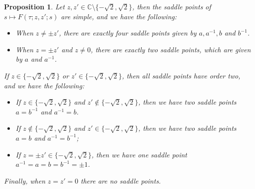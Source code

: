 \documentclass[%
 jmp,
cp,  %
 amsmath,amsthm,amssymb,%
 reprint,%
onecolumn]{revtex4-2}
\newtheorem{proposition}[theorem]{Proposition}
\begin{document}
\begin{proposition} \label{prop:saddlePointsDef}
Let $z,z'\in \mathbb C\setminus \{-\sqrt 2, \sqrt 2\}$, then the saddle points of $s\mapsto F(\tau;z,z';s)$ are simple, and we have the following:
\begin{itemize}
\item[(i)] When $z \neq  \pm z'$, there are exactly four saddle points  given by $a, a^{-1}, b$ and $b^{-1}$.
\item[(ii)] When $z=\pm z'$ and $z\neq 0$, there are exactly two  saddle points, which are given by $a$ and $a^{-1}$.
\end{itemize}
If $z\in \{-\sqrt{2},\sqrt{2}\}$ or $z'\in \{-\sqrt{2},\sqrt{2}\}$, then all saddle points have order two, and we have the following:
\begin{itemize}
    \item[(iii)] If $z\in \{-\sqrt 2, \sqrt 2\}$ and $z'\not\in \{-\sqrt 2, \sqrt 2\}$, then we have two saddle points $a=b^{-1}$ and $a^{-1}=b$.
        \item[(iv)] If $z\not\in \{-\sqrt 2, \sqrt 2\}$ and $z'\in \{-\sqrt 2, \sqrt 2\}$, then we have two saddle points $a=b$ and $a^{-1}=b^{-1}$;
    \item[(v)] If $z=\pm z'\in\{-\sqrt 2, \sqrt 2\}$, then we have one saddle point $a^{-1}=a=b=b^{-1}=\pm 1$.
\end{itemize}
Finally, when $z=z'=0$ there are no saddle points.
\end{proposition}
\end{document}
